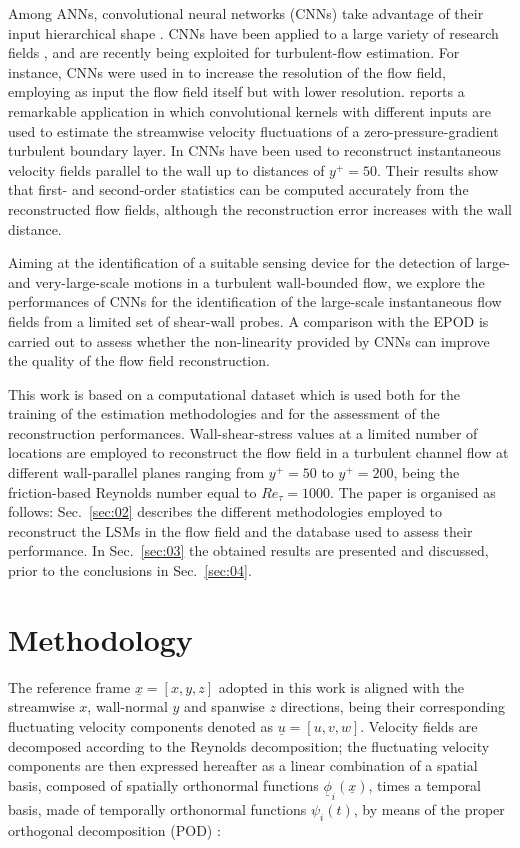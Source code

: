Among ANNs, convolutional neural networks (CNNs) take advantage of their input hierarchical shape \citep{fukushima1980neocognitron,lecun1985learning,fukushima1988neocognitron,lecun1989backpropagation}.
CNNs have been applied to a large variety of research fields \citep{liu2017survey,ou2019vector}, and are recently being exploited for turbulent-flow estimation.
For instance, CNNs were used in \citet{fukami2019super} to increase the resolution of the flow field, employing as input the flow field itself but with lower resolution.
\citet{sasaki2019transfer} reports a remarkable application in which convolutional kernels with different inputs are used to estimate the streamwise velocity fluctuations of a zero-pressure-gradient turbulent boundary layer.
In \citet{guastoni2020prediction} CNNs have been used to reconstruct instantaneous velocity fields parallel to the wall up to distances of $y^+=50$.
Their results show that first- and second-order statistics can be computed accurately from the reconstructed flow fields, although the reconstruction error increases with the wall distance.

Aiming at the identification of a suitable sensing device for the detection of large- and very-large-scale motions in a turbulent wall-bounded flow, we explore the performances of CNNs for the identification of the large-scale instantaneous flow fields from a limited set of shear-wall probes.
A comparison with the EPOD is carried out to assess whether the non-linearity provided by CNNs can improve the quality of the flow field reconstruction.

This work is based on a computational dataset which is used both for the training of the estimation methodologies and for the assessment of the reconstruction performances. Wall-shear-stress values at a limited number of locations are employed to reconstruct the flow field in a turbulent channel flow at different wall-parallel planes ranging from $y^+=50$ to $y^+=200$, being the friction-based Reynolds number equal to $Re_\tau =1000$.
The paper is organised as follows: Sec.~\ref{sec:02} describes the different methodologies employed to reconstruct the LSMs in the flow field and the database used to assess their performance.
In Sec.~\ref{sec:03} the obtained results are presented and discussed, prior to the conclusions in Sec.~\ref{sec:04}.


\section{\label{sec:02}Methodology}
The reference frame $\underline{x}=[x,y,z]$ adopted in this work is aligned with the streamwise $x$, wall-normal $y$ and spanwise $z$ directions, being their corresponding fluctuating velocity components denoted as $\underline{u}=[u,v,w]$.
Velocity fields are decomposed according to the Reynolds decomposition; the fluctuating velocity components are then expressed hereafter as a linear combination of a spatial basis, composed of spatially orthonormal functions $\underline{\phi}_i\left(\underline{x}\right)$, times a temporal basis, made of temporally orthonormal functions $\psi_i(t)$, by means of the proper orthogonal decomposition (POD) \citep{lumley1967structure}:

